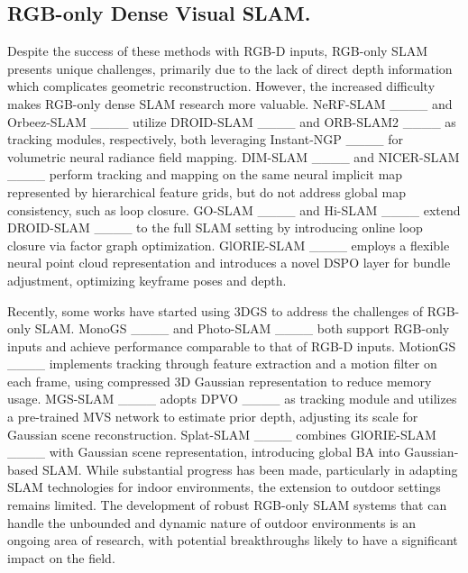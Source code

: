 \subsection{RGB-only Dense Visual SLAM. }

Despite the success of these methods with RGB-D inputs, RGB-only SLAM presents unique challenges, primarily due to the lack of direct depth information which complicates geometric reconstruction. However, the increased difficulty makes RGB-only dense SLAM research more valuable. NeRF-SLAM ____ and Orbeez-SLAM ____ utilize DROID-SLAM ____ and ORB-SLAM2 ____ as tracking modules, respectively, both leveraging Instant-NGP ____ for volumetric neural radiance field mapping. DIM-SLAM ____ and NICER-SLAM ____ perform tracking and mapping on the same neural implicit map represented by hierarchical feature grids, but do not address global map consistency, such as loop closure. GO-SLAM ____ and Hi-SLAM ____ extend DROID-SLAM ____ to the full SLAM setting by introducing online loop closure via factor graph optimization. GlORIE-SLAM ____ employs a flexible neural point cloud representation and introduces a novel DSPO layer for bundle adjustment, optimizing keyframe poses and depth.

Recently, some works have started using 3DGS to address the challenges of RGB-only SLAM. MonoGS ____ and Photo-SLAM ____ both support RGB-only inputs and achieve performance comparable to that of RGB-D inputs. MotionGS ____ implements tracking through feature extraction and a motion filter on each frame, using compressed 3D Gaussian representation to reduce memory usage. MGS-SLAM ____ adopts DPVO ____ as tracking module and utilizes a pre-trained MVS network to estimate prior depth, adjusting its scale for Gaussian scene reconstruction. Splat-SLAM ____ combines GlORIE-SLAM ____ with Gaussian scene representation, introducing global BA into Gaussian-based SLAM. 
While substantial progress has been made, particularly in adapting SLAM technologies for indoor environments, the extension to outdoor settings remains limited. The development of robust RGB-only SLAM systems that can handle the unbounded and dynamic nature of outdoor environments is an ongoing area of research, with potential breakthroughs likely to have a significant impact on the field.